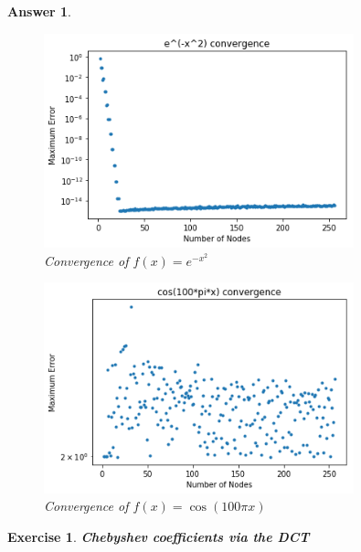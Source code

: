 \documentclass[12pt]{article}
\theoremstyle{colon}
\newtheorem{exercise}{Exercise}
\newtheorem*{answer}{Answer}
\begin{document}
\begin{answer}
\begin{enumerate}[label=\alph*)]
\begin{enumerate}[label=\roman*)]
          \begin{figure}[H]
            \centering
              \includegraphics[width=0.8\textwidth]{q2diiib.png}
            \caption{Convergence of $f(x) = e^{-x^2}$}
          \end{figure}

          \begin{figure}[H]
            \centering
              \includegraphics[width=0.8\textwidth]{q2diiic.png}
            \caption{Convergence of $f(x) = \cos(100 \pi x)$}
          \end{figure}

      \end{enumerate}

  \end{enumerate}
\end{answer}

\begin{exercise}
  \textbf{Chebyshev coefficients via the DCT}
\end{exercise}
\end{document}
